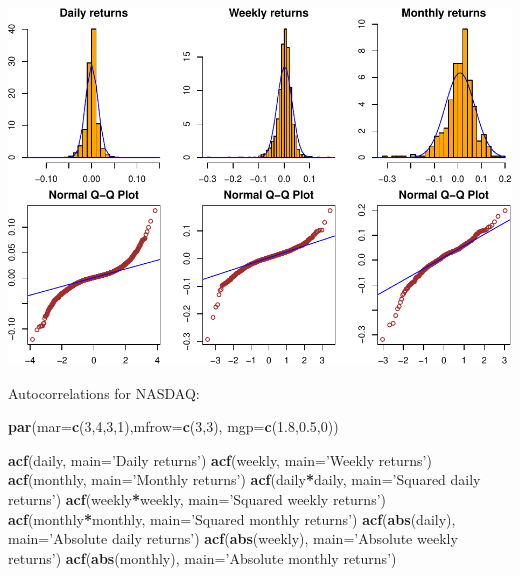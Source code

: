 \documentclass[11pt,]{article}
\newenvironment{Shaded}{\begin{snugshade}}{\end{snugshade}}
\newcommand{\DataTypeTok}[1]{\textcolor[rgb]{0.13,0.29,0.53}{#1}}
\newcommand{\DecValTok}[1]{\textcolor[rgb]{0.00,0.00,0.81}{#1}}
\newcommand{\FloatTok}[1]{\textcolor[rgb]{0.00,0.00,0.81}{#1}}
\newcommand{\KeywordTok}[1]{\textcolor[rgb]{0.13,0.29,0.53}{\textbf{#1}}}
\newcommand{\NormalTok}[1]{#1}
\newcommand{\OperatorTok}[1]{\textcolor[rgb]{0.81,0.36,0.00}{\textbf{#1}}}
\newcommand{\StringTok}[1]{\textcolor[rgb]{0.31,0.60,0.02}{#1}}
\begin{document}
\includegraphics{hw1_files/figure-latex/unnamed-chunk-4-1.pdf}

Autocorrelations for NASDAQ:

\begin{Shaded}
\begin{Highlighting}[]
\KeywordTok{par}\NormalTok{(}\DataTypeTok{mar=}\KeywordTok{c}\NormalTok{(}\DecValTok{3}\NormalTok{,}\DecValTok{4}\NormalTok{,}\DecValTok{3}\NormalTok{,}\DecValTok{1}\NormalTok{),}\DataTypeTok{mfrow=}\KeywordTok{c}\NormalTok{(}\DecValTok{3}\NormalTok{,}\DecValTok{3}\NormalTok{), }\DataTypeTok{mgp=}\KeywordTok{c}\NormalTok{(}\FloatTok{1.8}\NormalTok{,}\FloatTok{0.5}\NormalTok{,}\DecValTok{0}\NormalTok{)) }

\KeywordTok{acf}\NormalTok{(daily,  }\DataTypeTok{main=}\StringTok{'Daily returns'}\NormalTok{)}
\KeywordTok{acf}\NormalTok{(weekly, }\DataTypeTok{main=}\StringTok{'Weekly returns'}\NormalTok{)}
\KeywordTok{acf}\NormalTok{(monthly, }\DataTypeTok{main=}\StringTok{'Monthly returns'}\NormalTok{)}
\KeywordTok{acf}\NormalTok{(daily}\OperatorTok{*}\NormalTok{daily, }\DataTypeTok{main=}\StringTok{'Squared daily returns'}\NormalTok{)}
\KeywordTok{acf}\NormalTok{(weekly}\OperatorTok{*}\NormalTok{weekly, }\DataTypeTok{main=}\StringTok{'Squared weekly returns'}\NormalTok{)}
\KeywordTok{acf}\NormalTok{(monthly}\OperatorTok{*}\NormalTok{monthly, }\DataTypeTok{main=}\StringTok{'Squared monthly returns'}\NormalTok{)}
\KeywordTok{acf}\NormalTok{(}\KeywordTok{abs}\NormalTok{(daily), }\DataTypeTok{main=}\StringTok{'Absolute daily returns'}\NormalTok{)}
\KeywordTok{acf}\NormalTok{(}\KeywordTok{abs}\NormalTok{(weekly),  }\DataTypeTok{main=}\StringTok{'Absolute weekly returns'}\NormalTok{)}
\KeywordTok{acf}\NormalTok{(}\KeywordTok{abs}\NormalTok{(monthly), }\DataTypeTok{main=}\StringTok{'Absolute monthly returns'}\NormalTok{)}
\end{Highlighting}
\end{Shaded}
\end{document}
